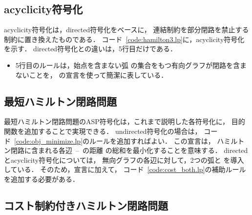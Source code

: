 \subsection{\textsf{acyclicity}符号化}



\textsf{acyclicity}符号化は，\textsf{directed}符号化をベースに，
連結制約を部分閉路を禁止する制約に置き換えたものである．
コード~\ref{code:hamilton3.lp}に，\textsf{acyclicity}符号化を示す．
\textsf{directed}符号化との違いは，5行目だけである．
\begin{itemize}
\item 5行目のルールは，始点を含まない弧
  の集合をもつ有向グラフが閉路を含まないことを，
  {\clingo}の宣言を使って簡潔に表している．
\end{itemize}

\subsection{最短ハミルトン閉路問題}\label{minexpl}

最短ハミルトン閉路問題のASP符号化は，これまで説明した各符号化に，
目的関数を追加することで実現できる．
\textsf{undirected}符号化の場合は，
コード~\ref{code:obj_minimize.lp}のルールを追加すればよい．
%
この宣言は，
ハミルトン閉路に含まれる各辺~--~の距離
の総和を最小化することを意味する．
%
\textsf{directed}と\textsf{acyclicity}符号化については，
無向グラフの各辺に対して，2つの弧と
を導入している．
そのため，宣言に加えて，
コード~\ref{code:cost_both.lp}の補助ルールを追加する必要がある．

\subsection{コスト制約付きハミルトン閉路問題}

